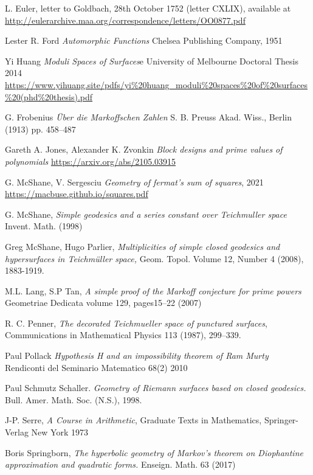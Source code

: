 \documentclass[12pt,a4paper]{amsart}
\begin{document}
L. Euler, letter to Goldbach, 28th October 1752 (letter CXLIX), available at
\url{http://eulerarchive.maa.org/correspondence/letters/OO0877.pdf}

Lester R. Ford 
\textit{Automorphic Functions} Chelsea Publishing Company, 1951

Yi Huang
\textit{Moduli Spaces of Surfaces}e University of Melbourne Doctoral Thesis 2014
\url{https://www.yihuang.site/pdfs/yi%20huang_moduli%20spaces%20of%20surfaces%20(phd%20thesis).pdf}

G. Frobenius
\textit{Über die Markoffschen Zahlen}
S. B. Preuss Akad. Wiss., Berlin (1913)
pp. 458–487

Gareth A. Jones, Alexander K. Zvonkin
\textit{Block designs and prime values of polynomials}
\url{https://arxiv.org/abs/2105.03915}

G. McShane, V. Sergesciu
\textit{Geometry of fermat’s sum of squares}, 2021 
\url{https://macbuse.github.io/squares.pdf}

G. McShane,
\textit{Simple geodesics and a series constant over Teichmuller space}
Invent. Math. (1998)

Greg McShane, Hugo Parlier,
\textit{Multiplicities of simple closed geodesics and hypersurfaces in Teichmüller space,}
Geom. Topol.
Volume 12, Number 4 (2008), 1883-1919.

M.L. Lang, S.P Tan,
\textit{A simple proof of the Markoff conjecture for prime powers}
Geometriae Dedicata volume 129, pages15–22 (2007)

R. C. Penner, 
\textit{The decorated Teichmueller space of punctured surfaces}, 
Communications in Mathematical Physics 113 (1987), 299–339.

Paul Pollack
\textit{ Hypothesis H and an impossibility theorem of Ram Murty }
Rendiconti del Seminario Matematico 68(2) 2010

 Paul Schmutz Schaller. 
 \textit{Geometry of Riemann surfaces based on closed geodesics.}
 Bull. Amer. Math. Soc. (N.S.),  1998.

J-P. Serre,
\textit{A Course in Arithmetic},
Graduate Texts in Mathematics,
Springer-Verlag New York
1973

Boris Springborn, 
\textit{The hyperbolic geometry of Markov’s theorem on Diophantine
approximation and quadratic forms.} Enseign. Math. 63 (2017)
\end{document}
